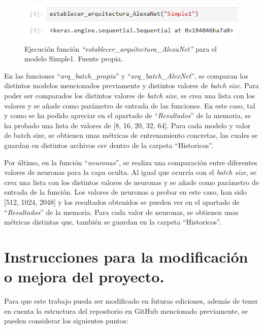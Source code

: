\begin{figure}[h]
    \centering
    \includegraphics[width=0.99\textwidth]{img/ejemplo_simple1_estab_arq_propia.PNG}
    \caption{Ejecución función \textit{``establecer\_arquitectura\_AlexaNet''} para el modelo Simple1. Fuente propia.}
    \label{fig:ejemplo_simple1_estab_arq_propia}
\end{figure}
\FloatBarrier

En las funciones ``\textit{arq\_batch\_propia}'' y ``\textit{arq\_batch\_AlexNet}'', se comparan los distintos modelos mencionados previamente y distintos valores de \textit{batch size}. Para poder ser comparados los distintos valores de \textit{batch size}, se crea una lista con los valores y se añade como parámetro de entrada de las funciones. En este caso, tal y como se ha podido apreciar en el apartado de ``\textit{Resultados}'' de la memoria, se ha probado una lista de valores de [8, 16, 20, 32, 64]. Para cada modelo y valor de batch size, se obtienen unas métricas de entrenamiento concretas, las cuales se guardan en distintos archivos csv dentro de la carpeta ``Historicos''.

Por último, en la función ``\textit{neuronas}'', se realiza una comparación entre diferentes valores de neuronas para la capa oculta. Al igual que ocurría con el \textit{batch size}, se crea una lista con los distintos valores de neuronas y se añade como parámetro de entrada de la función. Los valores de neuronas a probar en este caso, han sido [512, 1024, 2048] y los resultados obtenidos se pueden ver en el apartado de ``\textit{Resultados}'' de la memoria. Para cada valor de neuronas, se obtienen unas métricas distintas que, también se guardan en la carpeta ``Historicos''.



\section{Instrucciones para la modificación o mejora del proyecto.}

Para que este trabajo pueda ser modificado en futuras ediciones, además de tener en cuenta la estructura del repositorio en GitHub mencionado previamente, se pueden considerar los siguientes puntos:

